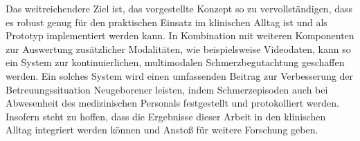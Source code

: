 Das weitreichendere Ziel ist, das vorgestellte Konzept so zu vervollständigen, dass es robust genug für den praktischen Einsatz im klinischen Alltag ist und als Prototyp implementiert werden kann. In Kombination mit weiteren Komponenten zur Auswertung zusätzlicher Modalitäten, wie beispielsweise Videodaten, kann so ein System zur kontinuierlichen, multimodalen Schmerzbegutachtung geschaffen werden. Ein solches System wird einen umfassenden Beitrag zur Verbesserung der Betreuungssituation Neugeborener leisten, indem Schmerzepisoden auch bei Abwesenheit des medizinischen Personals festgestellt und protokolliert werden. Insofern steht zu hoffen, dass die Ergebnisse dieser Arbeit in den klinischen Alltag integriert werden können und Anstoß für weitere Forschung geben.